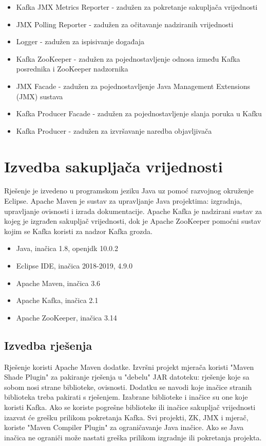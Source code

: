 \documentclass[utf8, diplomski, lmodern, numeric]{fer}
\begin{document}
\begin{itemize}
    \item Kafka JMX Metrics Reporter - zadužen za pokretanje sakupljača vrijednosti
    \item JMX Polling Reporter - zadužen za očitavanje nadziranih vrijednosti
    \item Logger - zadužen za ispisivanje događaja
    \item Kafka ZooKeeper - zadužen za pojednostavljenje odnosa između Kafka posrednika i ZooKeeper nadzornika
    \item JMX Facade - zadužen za pojednostavljenje Java Management Extensions (JMX) sustava
    \item Kafka Producer Facade - zadužen za pojednostavljenje slanja poruka u Kafku
    \item Kafka Producer - zadužen za izvršavanje naredba objavljivača
\end{itemize}



\chapter{Izvedba sakupljača vrijednosti}

Rješenje je izvedeno u programskom jeziku Java uz pomoć razvojnog okruženje Eclipse. Apache Maven je sustav za upravljanje Java projektima: izgradnja, upravljanje ovisnosti i izrada dokumentacije. Apache Kafka je nadzirani sustav za kojeg je izgrađen sakupljač vrijednosti, dok je Apache ZooKeeper pomoćni sustav kojim se Kafka koristi za nadzor Kafka grozda.

\begin{itemize}
    \item Java, inačica 1.8, openjdk 10.0.2
    \item Eclipse IDE, inačica 2018-2019, 4.9.0
    \item Apache Maven, inačica 3.6
    \item Apache Kafka, inačica 2.1
    \item Apache ZooKeeper, inačica 3.14
\end{itemize}


\section{Izvedba rješenja}

Rješenje koristi Apache Maven dodatke. Izvršni projekt mjerača koristi "Maven Shade Plugin" za pakiranje rješenja u "debelu" JAR datoteku: rješenje koje sa sobom nosi strane biblioteke, ovisnosti. Dodatku se navodi koje inačice stranih biblioteka treba pakirati s rješenjem. Izabrane biblioteke i inačice su one koje koristi Kafka. Ako se koriste pogrešne biblioteke ili inačice sakupljač vrijednosti izazvat će grešku prilikom pokretanja Kafka. Svi projekti, ZK, JMX i mjerač, koriste "Maven Compiler Plugin" za ograničavanje Java inačice. Ako se Java inačica ne ograniči može nastati greška prilikom izgradnje ili pokretanja projekta.
\end{document}
